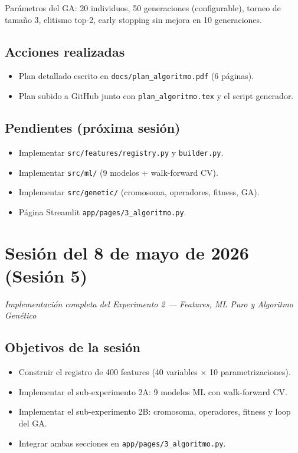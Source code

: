 \documentclass[12pt, a4paper]{article}
\newcommand{\sesion}[2]{%
  \section{Sesi\'{o}n del #1}%
  \textit{#2}%
  \vspace{0.5em}%
}
\begin{document}
Par\'{a}metros del GA: 20 individuos, 50 generaciones (configurable), torneo de tama\~{n}o 3,
elitismo top-2, early stopping sin mejora en 10 generaciones.

\subsection{Acciones realizadas}
\begin{itemize}
  \item Plan detallado escrito en \texttt{docs/plan\_algoritmo.pdf} (6 p\'{a}ginas).
  \item Plan subido a GitHub junto con \texttt{plan\_algoritmo.tex} y el script generador.
\end{itemize}

\subsection{Pendientes (pr\'{o}xima sesi\'{o}n)}
\begin{itemize}
  \item[$\boxtimes$] Implementar \texttt{src/features/registry.py} y \texttt{builder.py}.
  \item[$\boxtimes$] Implementar \texttt{src/ml/} (9 modelos + walk-forward CV).
  \item[$\boxtimes$] Implementar \texttt{src/genetic/} (cromosoma, operadores, fitness, GA).
  \item[$\boxtimes$] P\'{a}gina Streamlit \texttt{app/pages/3\_algoritmo.py}.
\end{itemize}

\newpage
\sesion{8 de mayo de 2026 (Sesi\'{o}n 5)}{Implementaci\'{o}n completa del Experimento 2 --- Features, ML Puro y Algoritmo Gen\'{e}tico}

\subsection{Objetivos de la sesi\'{o}n}
\begin{itemize}
  \item Construir el registro de 400 features (40 variables $\times$ 10 parametrizaciones).
  \item Implementar el sub-experimento 2A: 9 modelos ML con walk-forward CV.
  \item Implementar el sub-experimento 2B: cromosoma, operadores, fitness y loop del GA.
  \item Integrar ambas secciones en \texttt{app/pages/3\_algoritmo.py}.
\end{itemize}
\end{document}
